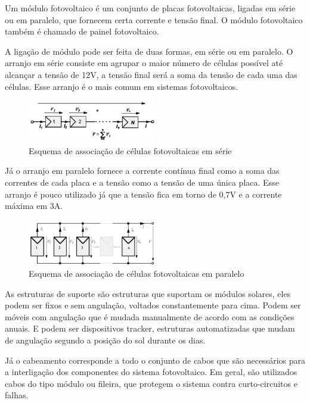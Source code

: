 Um módulo fotovoltaico é um conjunto de placas fotovoltaicas, ligadas em série ou em paralelo, que fornecem certa corrente e tensão final. O módulo fotovoltaico também é chamado de painel fotovoltaico.

A ligação de módulo pode ser feita de duas formas, em série ou em paralelo. O arranjo em série consiste em agrupar o maior número de células possível até alcançar a tensão de 12V, a tensão final será a soma da tensão de cada uma das células. Esse arranjo é o mais comum em sistemas fotovoltaicos.

\begin{figure}[!h]
\centering
\includegraphics[width=0.5\textwidth]{figuras/associacao.png}
\caption{Esquema de associação de células fotovoltaicas em série}
\label{fig:associacao}
\end{figure}

Já o arranjo em paralelo fornece a corrente contínua final como a soma das correntes de cada placa e a tensão como a tensão de uma única placa. Esse arranjo é pouco utilizado já que a tensão fica em torno de 0,7V e a corrente máxima em 3A.

\begin{figure}[!h]
\centering
\includegraphics[width=0.5\textwidth]{figuras/associacaoserie.png}
\caption{Esquema de associação de células fotovoltaicas em paralelo}
\label{fig:associacaoparalelo}
\end{figure}

As estruturas de suporte são estruturas que suportam os módulos solares, eles podem ser fixos e sem angulação, voltados constantemente para cima. Podem ser móveis com angulação que é mudada manualmente de acordo com as condições anuais. E podem ser dispositivos tracker, estruturas automatizadas que mudam de angulação segundo a posição do sol durante os dias. 

Já o cabeamento corresponde a todo o conjunto de cabos que são necessários para a interligação dos componentes do sistema fotovoltaico. Em geral, são utilizados cabos do tipo módulo ou fileira, que protegem o sistema contra curto-circuitos e falhas.


